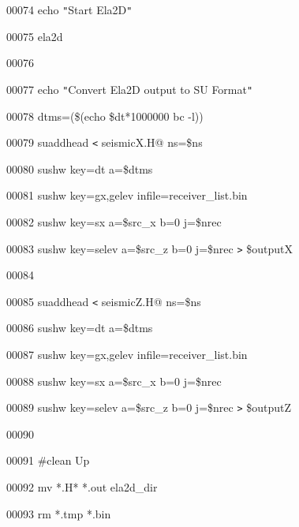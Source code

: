\documentclass{article}
\begin{document}
\vspace{4pt}
00074 echo \texttt{"}Start Ela2D\texttt{"}

\vspace{4pt}
00075 ela2d

\vspace{4pt}
00076 

\vspace{4pt}
00077 echo \texttt{"}Convert Ela2D output to SU Format\texttt{"}

\vspace{4pt}
00078 dtms=(\$(echo \$dt*1000000 \textbar{}bc -l))

\vspace{4pt}
00079 suaddhead \texttt{<} seismicX.H@ ns=\$ns \textbar{}

\vspace{4pt}
00080 sushw key=dt a=\$dtms \textbar{}

\vspace{4pt}
00081 sushw key=gx,gelev infile=receiver\_list.bin \textbar{}

\vspace{4pt}
00082 sushw key=sx a=\$src\_x b=0 j=\$nrec \textbar{}

\vspace{4pt}
00083 sushw key=selev a=\$src\_z b=0 j=\$nrec \texttt{>} \$outputX

\vspace{4pt}
00084 

\vspace{4pt}
00085 suaddhead \texttt{<} seismicZ.H@ ns=\$ns \textbar{}

\vspace{4pt}
00086 sushw key=dt a=\$dtms \textbar{}

\vspace{4pt}
00087 sushw key=gx,gelev infile=receiver\_list.bin \textbar{}

\vspace{4pt}
00088 sushw key=sx a=\$src\_x b=0 j=\$nrec  \textbar{}

\vspace{4pt}
00089 sushw key=selev a=\$src\_z b=0 j=\$nrec \texttt{>} \$outputZ

\vspace{4pt}
00090 

\vspace{4pt}
00091 \#clean Up

\vspace{4pt}
00092 mv *.H* *.out ela2d\_dir 

\vspace{4pt}
00093 rm *.tmp *.bin 
\end{document}
